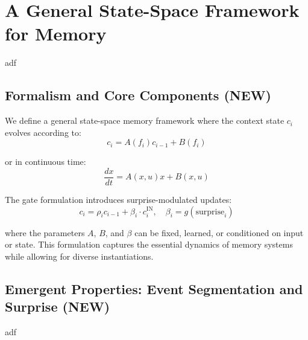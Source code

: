 \section{A General State-Space Framework for Memory}
adf

\subsection{Formalism and Core Components (NEW)} 
We define a general state-space memory framework where the context state $c_i$ evolves according to:
\begin{equation}
c_{i} = A(f_i) c_{i-1} + B(f_i)
\end{equation}

or in continuous time:
\begin{equation}
\frac{dx}{dt} = A(x, u) x + B(x, u)
\end{equation}

The gate formulation introduces surprise-modulated updates:
\begin{equation}
c_i = \rho_i c_{i-1} + \beta_i \cdot c^{\text{IN}}_i, \quad \beta_i = g(\text{surprise}_i)
\end{equation}

where the parameters $A$, $B$, and $\beta$ can be fixed, learned, or conditioned on input or state. This formulation captures the essential dynamics of memory systems while allowing for diverse instantiations.

\subsection{Emergent Properties: Event Segmentation and Surprise (NEW)}
adf 

